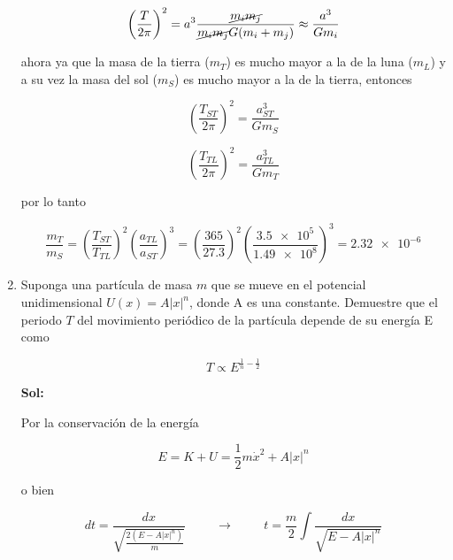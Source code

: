 \documentclass[12pt,a4paper]{article}
\begin{document}
\begin{enumerate}
    \begin{equation*}
        \left(\frac{T}{2\pi}\right)^{2} = a^3 \frac{\cancel{m_i m_j}}{\cancel{m_i m_j} G (m_i + m_j)} \approx \frac{a^3}{Gm_i}
    \end{equation*}
    
    ahora ya que la masa de la tierra ($m_T$) es mucho mayor a la de la luna ($m_L$) y a su vez la masa del sol ($m_S$) es mucho mayor a la de la tierra, entonces
    
    \begin{equation*}
        \left(\frac{T_{ST}}{2\pi}\right)^{2} = \frac{a_{ST}^{3}}{G m_S}
    \end{equation*}
    
    
    \begin{equation*}
        \left(\frac{T_{TL}}{2\pi}\right)^{2} = \frac{a_{TL}^{3}}{G m_T}
    \end{equation*}
    
    por lo tanto
    
    \begin{equation*}
        \frac{m_T}{m_S} = \left(\frac{T_{ST}}{T_{TL}}\right)^{2} \left(\frac{a_{TL}}{a_{ST}}\right)^{3} =  \left(\frac{365}{27.3}\right)^{2} \left(\frac{\num{3.5e5}}{\num{1.49e8}}\right)^{3} = \num{2.32e-6}
    \end{equation*}
    
    






\item Suponga una partícula de masa $m$ que se mueve en el potencial unidimensional $U(x) = A|x|^{n}$, donde A es una constante. Demuestre que el periodo $T$ del movimiento periódico de la partícula depende de su energía E como

\begin{equation*}
    T \propto E^{\frac{1}{n} - \frac{1}{2}}
\end{equation*}


\textbf{Sol:}

Por la conservación de la energía

\begin{equation*}
    E = K + U = \frac{1}{2} m \dot{x}^2 + A |x|^n
\end{equation*}

o bien

\begin{equation*}
    dt = \frac{dx}{\sqrt{\frac{2(E - A|x|^n)}{m}}} \hspace{1cm} \rightarrow \hspace{1cm} t =\frac{m}{2} \int  \frac{dx}{\sqrt{E - A|x|^n}}
\end{equation*}


\end{enumerate}
\end{document}
